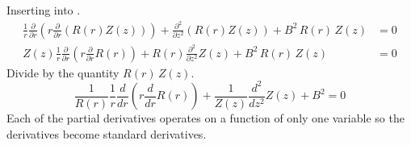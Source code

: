   Inserting  into .
  \begin{align}
    \frac{1}{r} \frac{\partial}{\partial r} \left( r \frac{\partial}{\partial r}
      \left(R(r) Z(z) \right) \right) + \frac{\partial^2}{\partial z^2} \left(
      R(r) Z(z) \right) + B^2 \,R(r) \, Z(z) &= 0 \\
    Z(z) \frac{1}{r} \frac{\partial}{\partial r} \left( r
    \frac{\partial}{\partial r} R(r) \right) + R(r) \frac{\partial^2}{\partial
    z^2} Z(z) + B^2 \, R(r) \, Z(z) &= 0
  \end{align}
  Divide by the quantity $R(r)\,Z(z)$.
  \begin{equation}
    \label{eq:finite_cyl_sum}
    \frac{1}{R(r)} \frac{1}{r} \frac{d}{d r} \left( r
    \frac{d}{d r} R(r) \right) + \frac{1}{Z(z)}
    \frac{d^2}{d z^2} Z(z) + B^2 = 0
  \end{equation}
  Each of the partial derivatives operates on a function of only one variable so
  the derivatives become standard derivatives.

